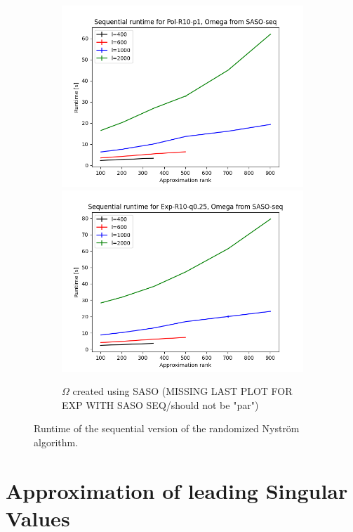 \documentclass{article}
\theoremstyle{definition}
\begin{document}
\begin{figure}
\begin{subfigure}[t]{0.35\textwidth}
    \includegraphics[width=\textwidth]{plots/runtime_new/runtime_Pol-R10-p1_SASO-seq.png}
    \includegraphics[width=\textwidth]{plots/runtime_new/runtime_par_Exp-R10-q0.25_SASO-seq.png}
    \caption{$\Omega$ created using SASO (MISSING LAST PLOT FOR EXP WITH SASO SEQ/should not be "par")}
\end{subfigure}\hfill
\caption{Runtime of the sequential version of the randomized Nyström algorithm.}
\label{fig:SequentialRuntime}
\end{figure}

\section{Approximation of leading Singular Values}
\end{document}
